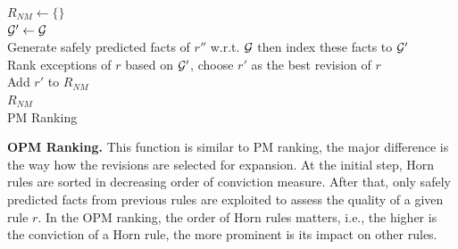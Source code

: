\IncMargin{1.5em}
\begin{algorithm}[H]
\DontPrintSemicolon
\SetAlgoLined
{}
\BlankLine
$R_{NM} \leftarrow \{\}$\\
\BlankLine
{} {
	$\mathcal{G}' \leftarrow \mathcal{G}$\\
	 {
		Generate safely predicted facts of $r''$ w.r.t. $\mathcal{G}$ then index these facts to $\mathcal{G}'$\\
	}
	Rank exceptions of $r$ based on $\mathcal{G}'$, choose $r'$ as the best revision of $r$\\
	Add $r'$ to $R_{NM}$\\
}
\Return $R_{NM}$\\
\caption{PM Ranking}
\label{bf_pm_ranking_algo}
\end{algorithm}
\DecMargin{1.5em}

\textbf{OPM Ranking.} This function is similar to PM ranking, the major difference is the way how the revisions are selected for expansion. At the initial step, Horn rules are sorted in decreasing order of conviction measure. After that, only safely predicted facts from previous rules are exploited to assess the quality of a given rule $r$. In the OPM ranking, the order of Horn rules matters, i.e., the higher is the conviction of a Horn rule, the more prominent is its impact on other rules.


